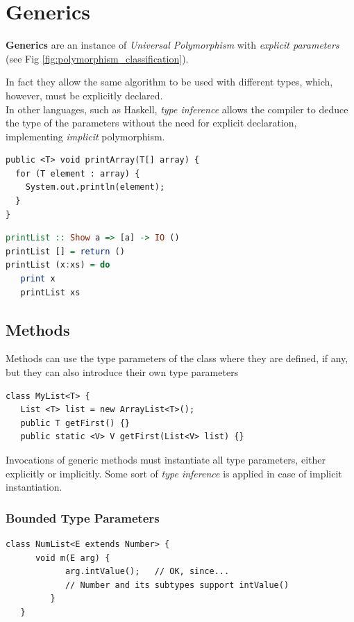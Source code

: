 \chapter{Generics}
\textbf{Generics} are an instance of \textit{Universal Polymorphism} with \textit{explicit parameters} (see Fig \ref{fig:polymorphism_classification}).

In fact they allow the same algorithm to be used with different types, which, however, must be explicitly declared.\\
In other languages, such as Haskell, \textit{type inference} allows the compiler to deduce the type of the parameters without the need for explicit declaration, implementing \textit{implicit} polymorphism.
\begin{paracol}{2}
   \begin{lstlisting}[caption={Java's explicit universal polymorphism}]
public <T> void printArray(T[] array) {
  for (T element : array) {
    System.out.println(element);
  }
}    
   \end{lstlisting}
 
   \switchcolumn

   \begin{lstlisting}[language=Haskell,caption={Haskell's implicit universal polymorphism}]
printList :: Show a => [a] -> IO ()
printList [] = return ()
printList (x:xs) = do
   print x
   printList xs         
   \end{lstlisting}
\end{paracol}

\section{Methods}
Methods can use the type parameters of the class
where they are defined, if any, but they can also introduce their own type parameters
\begin{lstlisting}
class MyList<T> {
   List <T> list = new ArrayList<T>();
   public T getFirst() {}
   public static <V> V getFirst(List<V> list) {}
\end{lstlisting}
Invocations of generic methods must instantiate all
type parameters, either explicitly or implicitly.
Some sort of \textit{type inference} is applied in case of implicit instantiation.

\subsection{Bounded Type Parameters}
\begin{lstlisting}
class NumList<E extends Number> {
      void m(E arg) {
            arg.intValue();   // OK, since...
            // Number and its subtypes support intValue()
         }
   }
\end{lstlisting}

